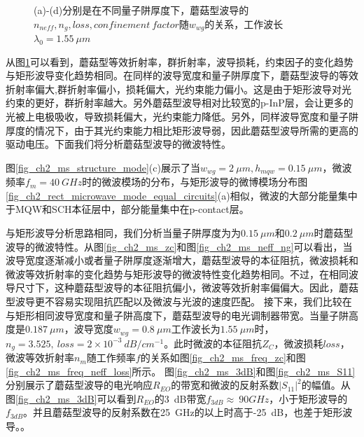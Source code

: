 \begin{figure}[htb]
{\begin{minipage}[]{0.5\textwidth}
		\end{minipage}}
\caption{(a)-(d)分别是在不同量子阱厚度下，蘑菇型波导的$n_{neff}, n_g, loss, confinement~factor$随$w_{wg}$的关系，工作波长$\lambda_0 = 1.55~\mu m$}
\label{fig_ch2_ms_property}
\end{figure}


从图\ref{fig_ch2_ms_property}可以看到，蘑菇型等效折射率，群折射率，波导损耗，约束因子的变化趋势与矩形波导变化趋势相同。在同样的波导宽度和量子阱厚度下，蘑菇型波导的等效折射率偏大,群折射率偏小，损耗偏大，光约束能力偏小。这是由于矩形波导对光约束的更好，群折射率越大。另外蘑菇型波导相对比较宽的p-InP层，会让更多的光被上电极吸收，导致损耗偏大，光约束能力降低。另外，同样波导宽度和量子阱厚度的情况下，由于其光约束能力相比矩形波导弱，因此蘑菇型波导所需的更高的驱动电压。下面我们将分析蘑菇型波导的微波特性。

图\ref{fig_ch2_ms_structure_mode}(c)展示了当$w_{wg} =2~\mu m, h_{mqw} = 0.15~ \mu m$，微波频率$f_m =40~ GHz$时的微波模场的分布，与矩形波导的微博模场分布图\ref{fig_ch2_rect_microwave_mode_equal_circuits}(a)相似，微波的大部分能量集中于MQW和SCH本征层中，部分能量集中在p-contact层。

与矩形波导分析思路相同，我们分析当量子阱厚度为为$0.15~ \mu m$和$0.2 ~\mu m$时蘑菇型波导的微波特性。从图\ref{fig_ch2_ms_zc}和图\ref{fig_ch2_ms_neff_ng}可以看出，当波导宽度逐渐减小或者量子阱厚度逐渐增大，蘑菇型波导的本征阻抗，微波损耗和微波等效折射率的变化趋势与矩形波导的微波特性变化趋势相同。不过，在相同波导尺寸下，这种蘑菇型波导的本征阻抗偏小，微波等效折射率偏偏大。因此，蘑菇型波导更不容易实现阻抗匹配以及微波与光波的速度匹配。
接下来，我们比较在与矩形相同波导宽度和量子阱高度下，蘑菇型波导的电光调制器带宽。当量子阱高度是$0.187~ \mu m$，波导宽度$w_{wg} = 0.8~ \mu m$工作波长为$1.55~ \mu m$时，$n_g = 3.525,~loss =  2\times 10^{-3} ~dB/cm^{-1} $。此时微波的本征阻抗$Z_C$，微波损耗$loss$，微波等效折射率$n_m$随工作频率$f$的关系如图\ref{fig_ch2_ms_freq_zc}和图\ref{fig_ch2_ms_freq_neff_loss}所示。
图\ref{fig_ch2_ms_3dB}和图\ref{fig_ch2_ms_S11}分别展示了蘑菇型波导的电光响应$R_{EO}$的带宽和微波的反射系数$|S_{11}|^2$的幅值。从图\ref{fig_ch2_ms_3dB}可以看到$R_{EO}$的3~dB带宽$f_{3dB}\approx ~90 GHz$，小于矩形波导的$f_{3dB}$。并且蘑菇型波导的反射系数在25~GHz的以上时高于-25~dB，也差于矩形波导。\cite{tang2012over}。

